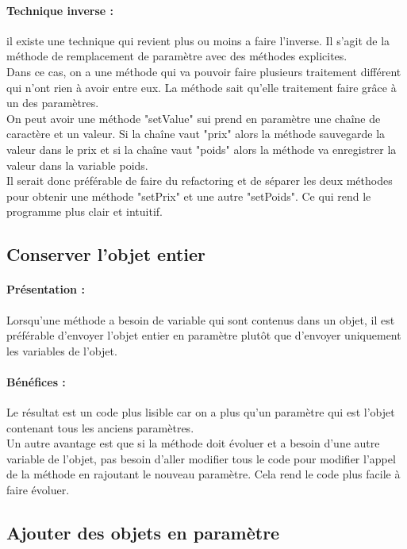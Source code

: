 \documentclass[a4paper,twoside,12pt,openright]{report}
\begin{document}
\paragraph{Technique inverse :}
il existe une technique qui revient plus ou moins a faire l'inverse. Il s'agit de la méthode de remplacement de paramètre avec des méthodes explicites.\\
Dans ce cas, on a une méthode qui va pouvoir faire plusieurs traitement différent qui n'ont rien à avoir entre eux. La méthode sait qu'elle traitement faire grâce à un des paramètres.\\
On peut avoir une méthode "setValue" sui prend en paramètre une chaîne de caractère et un valeur. Si la chaîne vaut "prix" alors la méthode sauvegarde la valeur dans le prix et si la chaîne vaut "poids" alors la méthode va enregistrer la valeur dans la variable poids.\\
Il serait donc préférable de faire du refactoring et de séparer les deux méthodes pour obtenir une méthode "setPrix" et une autre "setPoids". Ce qui rend le programme plus clair et intuitif.\\

\subsection{Conserver l'objet entier}
\paragraph{Présentation :}
Lorsqu'une méthode a besoin de variable qui sont contenus dans un objet, il est préférable d'envoyer l'objet entier en paramètre plutôt que d'envoyer uniquement les variables de l'objet.

\paragraph{Bénéfices :}
Le résultat est un code plus lisible car on a plus qu'un paramètre qui est l'objet contenant tous les anciens paramètres.\\
Un autre avantage est que si la méthode doit évoluer et a besoin d'une autre variable de l'objet, pas besoin d'aller modifier tous le code pour modifier l'appel de la méthode en rajoutant le nouveau paramètre. Cela rend le code plus facile à faire évoluer.\\

\subsection{Ajouter des objets en paramètre}
\end{document}
